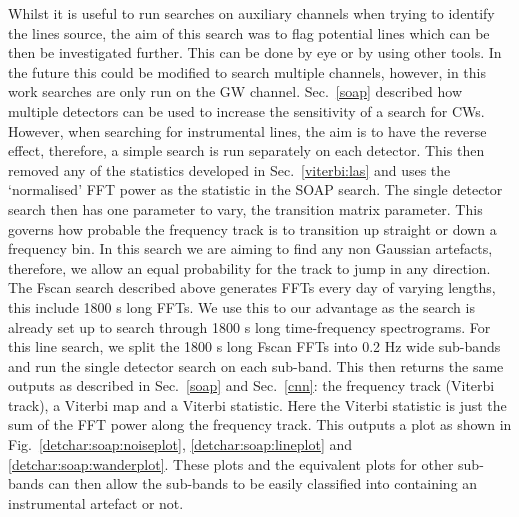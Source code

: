 Whilst it is useful to run searches on auxiliary channels when trying to identify the lines source, the aim of this search was to flag potential lines which can be then be investigated further.
This can be done by eye or by using other tools. 
In the future this could be modified to search multiple channels, however, in this work searches are only run on the \ac{GW} channel. 
Sec.~\ref{soap} described how multiple detectors can be used to increase the sensitivity of a search for \acp{CW}. 
However, when searching for instrumental lines, the aim is to have the reverse effect, therefore, a simple search is run separately on each detector. 
This then removed any of the statistics developed in Sec.~\ref{viterbi:las} and uses the `normalised' \ac{FFT} power as the statistic in the SOAP search.
The single detector search then has one parameter to vary, the transition matrix parameter. 
This governs how probable the frequency track is to transition up straight or down a frequency bin.
In this search we are aiming to find any non Gaussian artefacts, therefore, we allow an equal probability for the track to jump in any direction. 
The Fscan search described above generates \acp{FFT} every day of varying lengths, this include 1800 s long \acp{FFT}. 
We use this to our advantage as the search is already set up to search through 1800 s long time-frequency spectrograms. 
For this line search, we split the 1800 s long Fscan \acp{FFT} into 0.2 Hz wide sub-bands and run the single detector search on each sub-band. 
This then returns the same outputs as described in Sec.~\ref{soap} and Sec.~\ref{cnn}: the frequency track (Viterbi track), a Viterbi map and a Viterbi statistic. 
Here the Viterbi statistic is just the sum of the \ac{FFT} power along the frequency track. 
This outputs a plot as shown in Fig.~\ref{detchar:soap:noiseplot}, \ref{detchar:soap:lineplot} and \ref{detchar:soap:wanderplot}.
These plots and the equivalent plots for other sub-bands can then allow the sub-bands to be easily classified into containing an instrumental artefact or not. 



